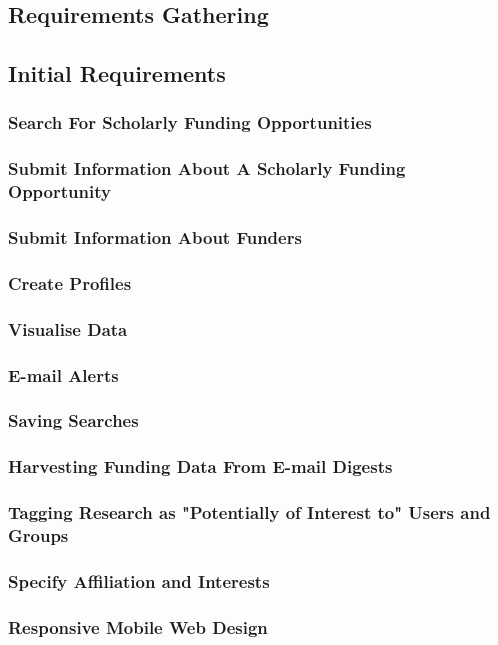 \subsection{Requirements Gathering}
\subsection{Initial Requirements}
\subsubsection{Search For Scholarly Funding Opportunities}
\subsubsection{Submit Information About A Scholarly Funding Opportunity}
\subsubsection{Submit Information About Funders}
\subsubsection{Create Profiles}
\subsubsection{Visualise Data}
\subsubsection{E-mail Alerts}
\subsubsection{Saving Searches}
\subsubsection{Harvesting Funding Data From E-mail Digests}
\subsubsection{Tagging Research as "Potentially of Interest to" Users and Groups}
\subsubsection{Specify Affiliation and Interests}
\subsubsection{Responsive Mobile Web Design}
